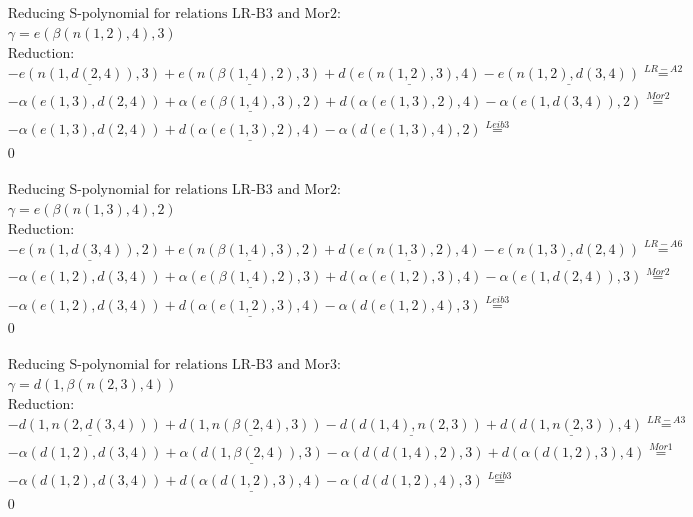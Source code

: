 \documentclass[11pt]{amsart}
\begin{document}
\begin{align*} 
& \text{Reducing S-polynomial for relations LR-B3 and Mor2:} \\ 
& \gamma = e(\beta(n(1,2),4),3) \\ 
& \text{Reduction}: \\& - \underline{e(n(1,d(2,4)),3)} + \underline{e(n(\beta(1,4),2),3)} + \underline{d(e(n(1,2),3),4)} - \underline{e(n(1,2),d(3,4))} \stackrel{ LR-A2 }{=}  \\ 
& - \alpha(e(1,3),d(2,4)) + \underline{\alpha(e(\beta(1,4),3),2)} + d(\alpha(e(1,3),2),4) - \alpha(e(1,d(3,4)),2) \stackrel{ Mor2 }{=}  \\ 
& - \alpha(e(1,3),d(2,4)) + \underline{d(\alpha(e(1,3),2),4)} - \alpha(d(e(1,3),4),2) \stackrel{ Leib3 }{=}  \\ 
&0\\ 
\end{align*} 
 
\begin{align*} 
& \text{Reducing S-polynomial for relations LR-B3 and Mor2:} \\ 
& \gamma = e(\beta(n(1,3),4),2) \\ 
& \text{Reduction}: \\& - \underline{e(n(1,d(3,4)),2)} + \underline{e(n(\beta(1,4),3),2)} + \underline{d(e(n(1,3),2),4)} - \underline{e(n(1,3),d(2,4))} \stackrel{ LR-A6 }{=}  \\ 
& - \alpha(e(1,2),d(3,4)) + \underline{\alpha(e(\beta(1,4),2),3)} + d(\alpha(e(1,2),3),4) - \alpha(e(1,d(2,4)),3) \stackrel{ Mor2 }{=}  \\ 
& - \alpha(e(1,2),d(3,4)) + \underline{d(\alpha(e(1,2),3),4)} - \alpha(d(e(1,2),4),3) \stackrel{ Leib3 }{=}  \\ 
&0\\ 
\end{align*} 
 
\begin{align*} 
& \text{Reducing S-polynomial for relations LR-B3 and Mor3:} \\ 
& \gamma = d(1,\beta(n(2,3),4)) \\ 
& \text{Reduction}: \\& - \underline{d(1,n(2,d(3,4)))} + \underline{d(1,n(\beta(2,4),3))} - \underline{d(d(1,4),n(2,3))} + \underline{d(d(1,n(2,3)),4)} \stackrel{ LR-A3 }{=}  \\ 
& - \alpha(d(1,2),d(3,4)) + \underline{\alpha(d(1,\beta(2,4)),3)} - \alpha(d(d(1,4),2),3) + d(\alpha(d(1,2),3),4) \stackrel{ Mor1 }{=}  \\ 
& - \alpha(d(1,2),d(3,4)) + \underline{d(\alpha(d(1,2),3),4)} - \alpha(d(d(1,2),4),3) \stackrel{ Leib3 }{=}  \\ 
&0\\ 
\end{align*} 
 
\end{document}
